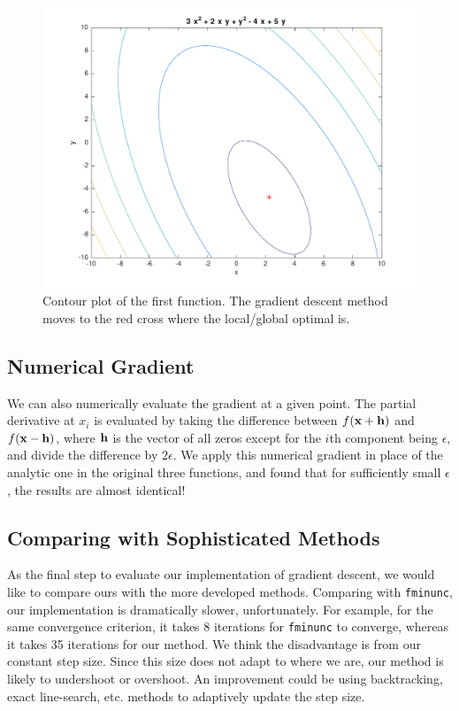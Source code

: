 \begin{figure}[h!]
\centering
\includegraphics[scale=0.4]{hw1_2_1.pdf}
\caption{Contour plot of the first function. The gradient descent method moves to the red cross where the local/global optimal is.}
\end{figure}


\subsection{Numerical Gradient}
We can also numerically evaluate the gradient at a given point. The partial derivative at $x_i$ is evaluated by taking the difference between $f(\boldsymbol{\mathbf{x}}+\boldsymbol{\mathbf{h}})$ and $f(\boldsymbol{\mathbf{x}}-\boldsymbol{\mathbf{h}})$, where $\boldsymbol{\mathbf{h}}$ is the vector of all zeros except for the $i$th component being $\epsilon$, and divide the difference by $2\epsilon$. We apply this numerical gradient in place of the analytic one in the original three functions, and found that for sufficiently small $\epsilon$, the results are almost identical!

\subsection{Comparing with Sophisticated Methods}
As the final step to evaluate our implementation of gradient descent, we would like to compare ours with the more developed methods. Comparing with \texttt{fminunc}, our implementation is dramatically slower, unfortunately. For example, for the same convergence criterion, it takes 8 iterations for \texttt{fminunc} to converge, whereas it takes 35 iterations for our method. We think the disadvantage is from our constant step size. Since this size does not adapt to where we are, our method is likely to undershoot or overshoot. An improvement could be using backtracking, exact line-search, etc. methods to adaptively update the step size.  